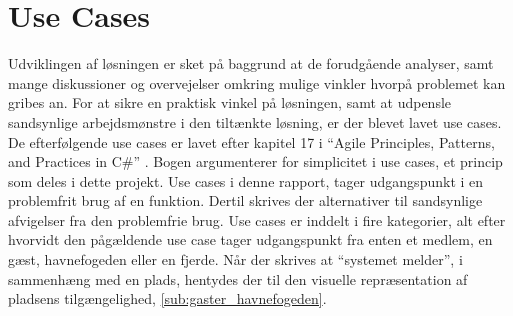 \section{Use Cases}

Udviklingen af løsningen er sket på baggrund at de forudgående analyser, samt mange diskussioner og overvejelser omkring mulige vinkler hvorpå problemet kan gribes an. For at sikre en praktisk vinkel på løsningen, samt at udpensle sandsynlige arbejdsmønstre i den tiltænkte løsning, er der blevet lavet use cases. De efterfølgende use cases er lavet efter kapitel 17 i \enquote{Agile Principles, Patterns, and Practices in C\#} \cite{martin2006agile}. Bogen argumenterer for simplicitet i use cases, et princip som deles i dette projekt. Use cases i denne rapport, tager udgangspunkt i en problemfrit brug af en funktion. Dertil skrives der alternativer til sandsynlige afvigelser fra den problemfrie brug. Use cases er inddelt i fire kategorier, alt efter hvorvidt den pågældende use case tager udgangspunkt fra enten et medlem, en gæst, havnefogeden eller en fjerde. Når der skrives at \enquote{systemet melder}, i sammenhæng med en plads, hentydes der til den visuelle repræsentation af pladsens tilgængelighed, \cref{sub:gaster_havnefogeden}.

